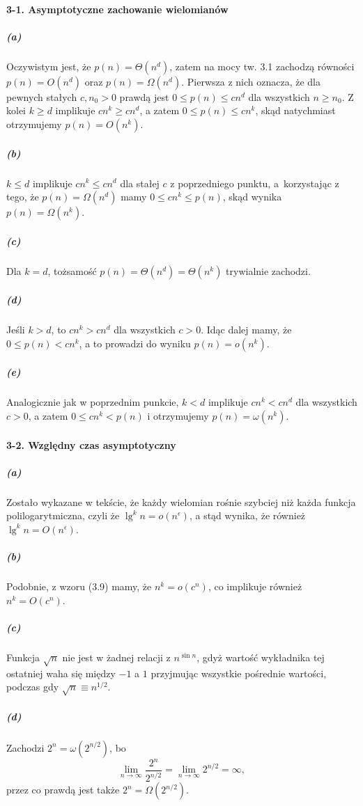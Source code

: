 \paragraph{3-1. Asymptotyczne zachowanie wielomianów}

\subparagraph{(a)}
Oczywistym jest, że $p(n) = \Theta(n^d)$, zatem na mocy tw. 3.1 zachodzą równości $p(n) = O(n^d)$ oraz $p(n) = \Omega(n^d)$. Pierwsza z nich oznacza, że dla pewnych stałych $c,n_0>0$ prawdą jest $0\le p(n)\le cn^d$ dla wszystkich $n\ge n_0$. Z kolei $k\ge d$ implikuje $cn^k\ge cn^d$, a zatem $0\le p(n)\le cn^k$, skąd natychmiast otrzymujemy $p(n) = O(n^k)$.
 
\subparagraph{(b)}
$k\le d$ implikuje $cn^k\le cn^d$ dla stałej $c$ z poprzedniego punktu, a~korzystając z tego, że $p(n) = \Omega(n^d)$ mamy $0\le cn^k\le p(n)$, skąd wynika $p(n)=\Omega(n^k)$.

\subparagraph{(c)}
Dla $k=d$, tożsamość $p(n) = \Theta(n^d) = \Theta(n^k)$ trywialnie zachodzi.

\subparagraph{(d)}
Jeśli $k>d$, to $cn^k>cn^d$ dla wszystkich $c>0$. Idąc dalej mamy, że $0\le p(n)<cn^k$, a to prowadzi do wyniku $p(n)=o(n^k)$.

\subparagraph{(e)}
Analogicznie jak w poprzednim punkcie, $k<d$ implikuje $cn^k<cn^d$ dla wszystkich $c>0$, a zatem $0\le cn^k<p(n)$ i otrzymujemy $p(n)=\omega(n^k)$.

\paragraph{3-2. Względny czas asymptotyczny}

\subparagraph{(a)}
Zostało wykazane w tekście, że każdy wielomian rośnie szybciej niż każda funkcja polilogarytmiczna, czyli że $\lg^kn=o(n^\epsilon)$, a stąd wynika, że również $\lg^kn=O(n^\epsilon)$.

\subparagraph{(b)}
Podobnie, z wzoru (3.9) mamy, że $n^k=o(c^n)$, co implikuje również $n^k=O(c^n)$.

\subparagraph{(c)}
Funkcja $\sqrt{n}$ nie jest w żadnej relacji z $n^{\sin n}$, gdyż wartość wykładnika tej ostatniej waha się między $-1$ a $1$ przyjmując wszystkie pośrednie wartości, podczas gdy $\sqrt{n}\equiv n^{1/2}$.

\subparagraph{(d)}
Zachodzi $2^n=\omega(2^{n/2})$, bo
\[
  \lim_{n\to\infty}\frac{2^n}{2^{n/2}}=\lim_{n\to\infty}2^{n/2}=\infty,
\]
przez co prawdą jest także $2^n=\Omega(2^{n/2})$.

